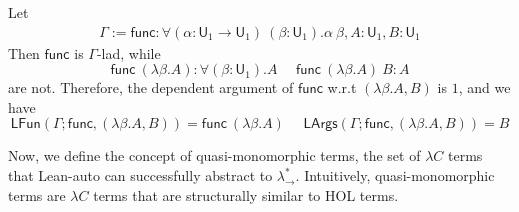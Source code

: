 \begin{example} Let
  \begin{align*}
    \Gamma := \mathsf{func} : \forall (\alpha : \mathsf{U}_1 \to \mathsf{U}_1) \ (\beta : \mathsf{U}_1). \alpha \ \beta,
      A : \mathsf{U}_1, B : \mathsf{U}_1 
  \end{align*}
  Then $\mathsf{func}$ is $\Gamma$-lad, while
  $$\mathsf{func} \ (\lambda \beta. A) : \forall (\beta : \mathsf{U}_1). A \ \ \ \ \ \
  \mathsf{func} \ (\lambda \beta. A) \ B : A$$
  are not. Therefore, the dependent argument of $\mathsf{func}$ w.r.t $(\lambda \beta. A, B)$ is $1$, and
  we have
  $$\mathsf{LFun}(\Gamma; \mathsf{func}, (\lambda \beta. A, B)) = \mathsf{func} \ (\lambda \beta . A) \ \ \ \ \ \
  \mathsf{LArgs}(\Gamma; \mathsf{func}, (\lambda \beta. A, B)) = B$$
\end{example}

Now, we define the concept of quasi-monomorphic terms, the set of $\lambda C$ terms
  that Lean-auto can successfully abstract to $\lambda_\to^*$. Intuitively, quasi-monomorphic
  terms are $\lambda C$ terms that are structurally similar to HOL terms.

